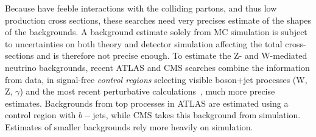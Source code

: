 Because \IP have feeble interactions with the colliding partons, and thus low production cross sections, these searches need very precises estimate of the shapes of the backgrounds.
A background estimate solely from MC simulation is subject to uncertainties on both theory and detector simulation affecting the total cross-sections and is therefore not precise enough.
To estimate the Z- and W-mediated neutrino backgrounds, recent ATLAS and CMS searches combine the information from data, in signal-free \textit{control regions} selecting visible boson+jet processes (W, Z, $\gamma$) and the most recent perturbative calculations~\cite{Lindert:2017olm}, much more precise estimates.
Backgrounds from top processes in ATLAS are estimated using a control region with $b-$jets, while CMS takes this background from simulation.
Estimates of smaller backgrounds rely more heavily on simulation.

